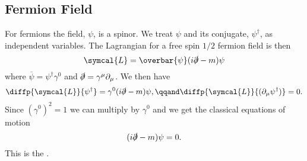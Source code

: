 \documentclass[fleqn]{NotesClass}
\newcommand{\ident}{1}
\newcommand{\hermit}{\dagger}
\newcommand{\diracadjoint}[1]{\overbar{#1}}
\newcommand{\lagrangianDensity}{\symcal{L}}
\begin{document}
    \subsection{Fermion Field}
    For fermions the field, \(\psi\), is a spinor.
    We treat \(\psi\) and its conjugate, \(\psi^\hermit\), as independent variables.
    The Lagrangian for a free spin \(1/2\) fermion field is then
    \begin{equation}
        \lagrangianDensity = \diracadjoint{\psi} (i\slashed{\partial} - m)\psi
    \end{equation}
    where \(\diracadjoint{\psi} = \psi^\hermit\gamma^0\) and \(\slashed{\partial} = \gamma^\mu \partial_\mu\).
    We then have
    \begin{equation}
        \diffp{\lagrangianDensity}{\psi^\hermit} = \gamma^0(i\slashed{\partial} - m)\psi, \qqand \diffp{\lagrangianDensity}{(\partial_\mu \psi^\hermit)} = 0.
    \end{equation}
    Since \((\gamma^0)^2 = \ident\) we can multiply by \(\gamma^0\) and we get the classical equations of motion
    \begin{equation}
        (i\slashed{\partial} - m)\psi = 0.
    \end{equation}
    This is the .
    
\end{document}
